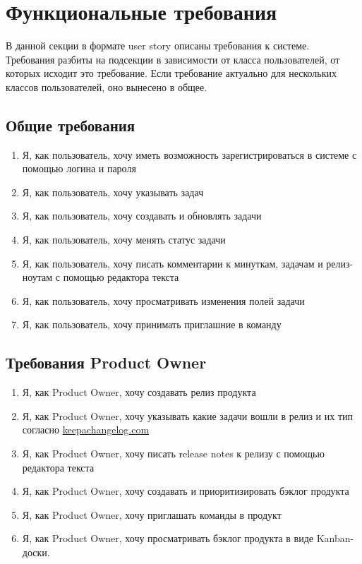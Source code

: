 \section{Функциональные требования}

В данной секции в формате user story описаны требования к системе.
Требования разбиты на подсекции в зависимости от класса пользователей,
от которых исходит это требование.
Если требование актуально для нескольких классов пользователей, оно
вынесено в общее.

\subsection{Общие требования}
\begin{enumerate}[label=\textbf{FR\arabic*}.]
  \item Я, как пользователь, хочу иметь возможность зарегистрироваться в системе с помощью логина и пароля
  \item Я, как пользователь, хочу указывать  задач
  \item Я, как пользователь, хочу создавать и обновлять задачи
  \item Я, как пользователь, хочу менять статус задачи
  \item Я, как пользователь, хочу писать комментарии к минуткам, задачам и релиз-ноутам с помощью редактора текста
  \item Я, как пользователь, хочу просматривать изменения полей задачи
  \item Я, как пользователь, хочу принимать приглашние в команду
\end{enumerate}

\subsection{Требования Product Owner}
\begin{enumerate}[label=\textbf{POR\arabic*}.]
  \item Я, как Product Owner, хочу создавать релиз продукта
  \item Я, как Product Owner, хочу указывать какие задачи вошли в релиз и
        их тип согласно \url{keepachangelog.com}
  \item Я, как Product Owner, хочу писать release notes к релизу с помощью редактора текста
  \item Я, как Product Owner, хочу создавать и приоритизировать бэклог продукта
  \item Я, как Product Owner, хочу приглашать команды в продукт
  \item Я, как Product Owner, хочу просматривать бэклог продукта в виде Kanban-доски.
\end{enumerate}

